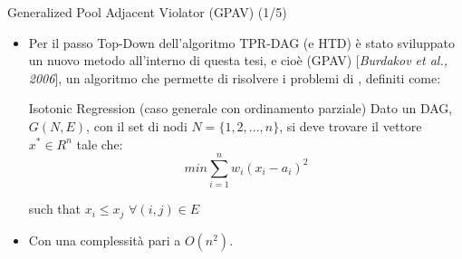 \documentclass[9pt]{beamer}
\begin{document}
\begin{tframe}{Generalized Pool Adjacent Violator (GPAV) (1/5)}
\begin{itemize}
\item Per il passo Top-Down dell’algoritmo TPR-DAG (e HTD) è stato sviluppato un nuovo metodo all'interno di questa tesi, e cioè  (GPAV) [\emph{Burdakov et al., 2006}], un algoritmo che permette di risolvere i problemi di , definiti come:
\begin{block}{Isotonic Regression (caso generale con ordinamento parziale)}
Dato un DAG, $G(N, E)$, con il set di nodi $N = \{1, 2, ..., n\}$, si deve trovare il vettore $x^{*}\in R^{n}$ tale che:
\[
min \sum_{i=1}^{n} w_i (x_i - a_i)^2
\]
\begin{center}
such that $x_i \le x_j$ $\forall (i,j) \in E $ 
\end{center}
\end{block} 
\item Con una complessità pari a $O(n^2)$.
\end{itemize}
\end{tframe}
\end{document}
